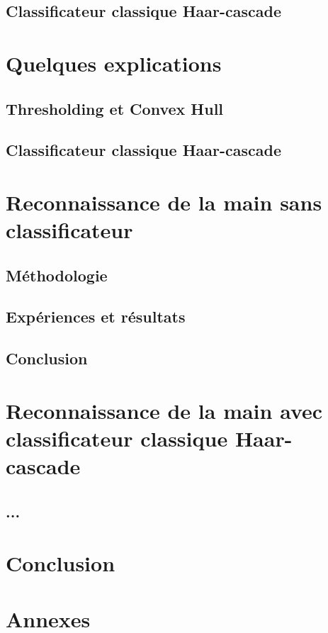 \documentclass[11pt]{article}
\begin{document}
\subsection{Classificateur classique Haar-cascade}
\newpage

\section{Quelques explications}
\subsection{Thresholding et Convex Hull}
\subsection{Classificateur classique Haar-cascade}
\newpage

\section{Reconnaissance de la main sans classificateur}
\subsection{Méthodologie}
\subsection{Expériences et résultats}
\subsection{Conclusion}
\newpage

\section{Reconnaissance de la main avec classificateur classique Haar-cascade}
\subsection{...}

\section*{Conclusion}
\newpage

\section*{Annexes}
\end{document}
